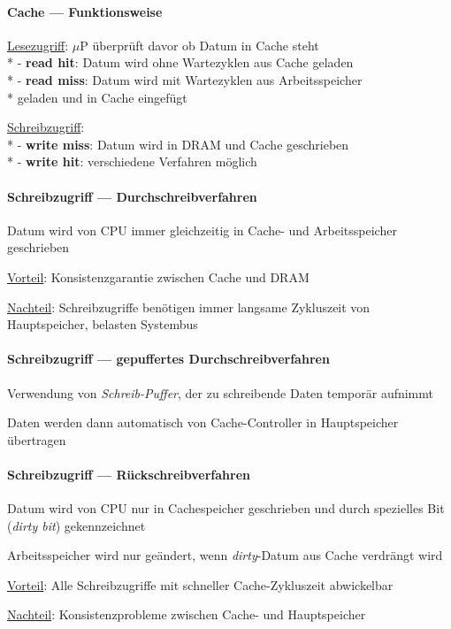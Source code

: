 \paragraph{Cache --- Funktionsweise}
\begin{items}
	\item \underline{Lesezugriff}: \( \mu \)P überprüft davor ob Datum in Cache steht \\*
		- \textbf{read hit}: Datum wird ohne Wartezyklen aus Cache geladen \\*
		- \textbf{read miss}: Datum wird mit Wartezyklen aus Arbeitsspeicher \\* \phantom{-} geladen und in Cache eingefügt
	\item \underline{Schreibzugriff}: \\*
		- \textbf{write miss}: Datum wird in DRAM und Cache geschrieben \\*
		- \textbf{write hit}: verschiedene Verfahren möglich
\end{items}

\paragraph{Schreibzugriff --- Durchschreibverfahren}
\begin{items}
	\item Datum wird von CPU immer gleichzeitig in Cache- und Arbeitsspeicher geschrieben
	\item \underline{Vorteil}: Konsistenzgarantie zwischen Cache und DRAM
	\item \underline{Nachteil}: Schreibzugriffe benötigen immer langsame Zykluszeit von Hauptspeicher, belasten Systembus
\end{items}

\paragraph{Schreibzugriff --- gepuffertes Durchschreibverfahren}
\begin{items}
	\item Verwendung von \emph{Schreib-Puffer}, der zu schreibende Daten temporär aufnimmt
	\item Daten werden dann automatisch von Cache-Controller in Hauptspeicher übertragen
\end{items}

\paragraph{Schreibzugriff --- Rückschreibverfahren}
\begin{items}
	\item Datum wird von CPU nur in Cachespeicher geschrieben und durch spezielles Bit (\emph{dirty bit}) gekennzeichnet
	\item Arbeitsspeicher wird nur geändert, wenn \emph{dirty}-Datum aus Cache verdrängt wird
	\item \underline{Vorteil}: Alle Schreibzugriffe mit schneller Cache-Zykluszeit abwickelbar
	\item \underline{Nachteil}: Konsistenzprobleme zwischen Cache- und Hauptspeicher
\end{items}

